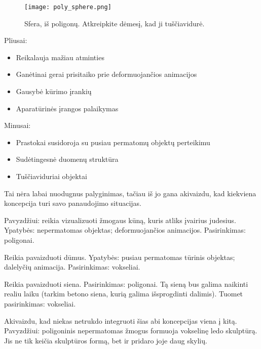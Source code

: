 \begin{figure}[!ht]
\centering
\texttt{[image: poly\_sphere.png]}
\caption{Sfera, iš poligonų. Atkreipkite dėmesį, kad ji tuščiavidurė.}
\label{fig:poly_sphere}
\end{figure}

Pliusai:

\begin{itemize}
\item Reikalauja mažiau atminties
\item Ganėtinai gerai prisitaiko prie deformuojančios animacijos
\item Gausybė kūrimo įrankių
\item Aparatūrinės įrangos palaikymas
\end{itemize}

Minusai:

\begin{itemize}
\item Prastokai susidoroja su pusiau permatomų objektų perteikimu
\item Sudėtingesnė duomenų struktūra
\item Tuščiaviduriai objektai
\end{itemize}

Tai nėra labai nuodugnus palyginimas, tačiau iš jo gana akivaizdu, kad
kiekviena koncepcija turi savo panaudojimo situacijas.

Pavyzdžiui: reikia vizualizuoti žmogaus kūną, kuris atliks įvairius judesius.
Ypatybės: nepermatomas objektas; deformuojančios animacijos. Pasirinkimas:
poligonai.

Reikia pavaizduoti dūmus. Ypatybės: pusiau permatomas tūrinis objektas;
dalelyčių animacija. Pasirinkimas: vokseliai.

Reikia pavaizduoti siena. Pasirinkimas: poligonai. Tą sieną bus galima
naikinti realiu laiku (tarkim betono siena, kurią galima išsprogdinti
dalimis). Tuomet pasirinkimas: vokseliai.

Akivaizdu, kad niekas netrukdo integruoti šias abi koncepcijas viena į kitą.
Pavyzdžiui: poligoninis nepermatomas žmogus formuoja vokselinę ledo skulptūrą.
Jis ne tik keičia skulptūros formą, bet ir pridaro joje daug skylių.

